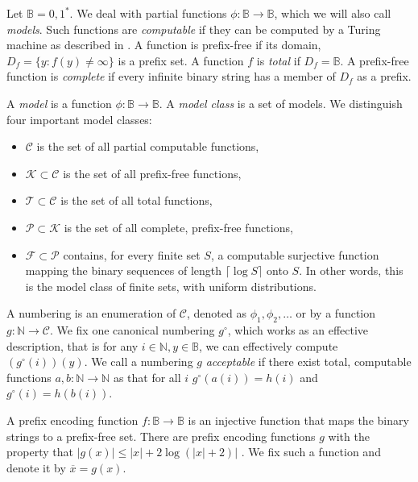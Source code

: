 \documentclass{style/llncs}
\newcommand{\C}{\mathscr C}
\newcommand{\T}{\mathscr T}
\newcommand{\F}{\mathscr F}
\renewcommand{\P}{\mathscr P}
\newcommand{\K}{\mathscr K}
\newcommand{\B}{\mathbb B}
\newcommand{\N}{\mathbb N}
\newcommand{\br}[1]{\overline{#1}}
\begin{document}
Let $\B = {0,1}^*$. We deal with partial functions $\phi: \B \to \B$, which we will also call \emph{models}. Such functions are \emph{computable} if they can be computed by a Turing machine as described in \cite[Definition~1.7.1]{li1993introduction}. A function is prefix-free if its domain, $D_f = \{y : f(y) \neq \infty\}$ is a prefix set. A function $f$ is \emph{total} if $D_f = \B$. A prefix-free function is \emph{complete} if every infinite binary string has a member of $D_f$ as a prefix. \footnotemark 


\begin{definition}
  A \emph{model} is a function $\phi:\B\to\B$. A
  \emph{model class} is a set of models. We distinguish four important
  model classes:
  \begin{itemize}
  \item $\C$ is the set of all partial computable functions,
  \item $\K\subset\C$ is the set of all prefix-free
    functions,
  \item $\T\subset\C$ is the set of all total functions,
  \item $\P\subset\K$ is the set of all complete, prefix-free functions,
  \item $\F\subset\P$ contains, for every finite set $S$, a computable
    surjective function mapping the binary sequences of length
    $\lceil\log S\rceil$ onto $S$. In other words, this is the model class of finite sets, with uniform distributions.
  \end{itemize}
\end{definition}
\begin{definition}[Numberings]
A numbering is an enumeration of $\C$, denoted as $\phi_1, \phi_2, \ldots$ or by a function $g: \N \to \C$. We fix one canonical numbering $g^\circ$, which works as an effective description, that is for any $i \in \N, y\in \B$, we can effectively compute $(g^\circ(i))(y)$. We call a numbering $g$ \emph{acceptable} if there exist total, computable functions $a, b: \N \to \N$ as that for all $i$ $g^\circ(a(i)) = h(i)$ and  $g^\circ(i) = h(b(i))$.
\end{definition}

\begin{definition}
  A prefix encoding function $f:\B\to\B$ is an injective
  function that maps the binary strings to a prefix-free set. There
  are prefix encoding functions $g$ with the property that
  $|g(x)|\le|x|+2\log(|x|+2)|$ \cite{li1993introduction}. We fix such a function and
  denote it by $\br{x}=g(x)$.
\end{definition}
\end{document}

